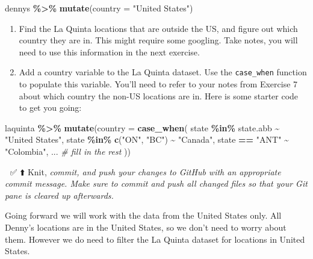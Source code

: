 \documentclass[
]{article}
\newenvironment{Shaded}{\begin{snugshade}}{\end{snugshade}}
\newcommand{\AttributeTok}[1]{\textcolor[rgb]{0.13,0.29,0.53}{#1}}
\newcommand{\CommentTok}[1]{\textcolor[rgb]{0.56,0.35,0.01}{\textit{#1}}}
\newcommand{\FunctionTok}[1]{\textcolor[rgb]{0.13,0.29,0.53}{\textbf{#1}}}
\newcommand{\NormalTok}[1]{#1}
\newcommand{\SpecialCharTok}[1]{\textcolor[rgb]{0.81,0.36,0.00}{\textbf{#1}}}
\newcommand{\StringTok}[1]{\textcolor[rgb]{0.31,0.60,0.02}{#1}}
\begin{document}
\begin{Shaded}
\begin{Highlighting}[]
\NormalTok{dennys }\SpecialCharTok{\%\textgreater{}\%}
  \FunctionTok{mutate}\NormalTok{(}\AttributeTok{country =} \StringTok{"United States"}\NormalTok{)}
\end{Highlighting}
\end{Shaded}

\begin{enumerate}
\def\labelenumi{\arabic{enumi}.}
\setcounter{enumi}{6}
\item
  Find the La Quinta locations that are outside the US, and figure out
  which country they are in. This might require some googling. Take
  notes, you will need to use this information in the next exercise.
\item
  Add a country variable to the La Quinta dataset. Use the
  \texttt{case\_when} function to populate this variable. You'll need to
  refer to your notes from Exercise 7 about which country the non-US
  locations are in. Here is some starter code to get you going:
\end{enumerate}

\begin{Shaded}
\begin{Highlighting}[]
\NormalTok{laquinta }\SpecialCharTok{\%\textgreater{}\%}
  \FunctionTok{mutate}\NormalTok{(}\AttributeTok{country =} \FunctionTok{case\_when}\NormalTok{(}
\NormalTok{    state }\SpecialCharTok{\%in\%}\NormalTok{ state.abb     }\SpecialCharTok{\textasciitilde{}} \StringTok{"United States"}\NormalTok{,}
\NormalTok{    state }\SpecialCharTok{\%in\%} \FunctionTok{c}\NormalTok{(}\StringTok{"ON"}\NormalTok{, }\StringTok{"BC"}\NormalTok{) }\SpecialCharTok{\textasciitilde{}} \StringTok{"Canada"}\NormalTok{,}
\NormalTok{    state }\SpecialCharTok{==} \StringTok{"ANT"}           \SpecialCharTok{\textasciitilde{}} \StringTok{"Colombia"}\NormalTok{,}
\NormalTok{    ...                      }\CommentTok{\# fill in the rest}
\NormalTok{  ))}
\end{Highlighting}
\end{Shaded}

🧶 ✅ ⬆️ Knit, \emph{commit, and push your changes to GitHub with an
appropriate commit message. Make sure to commit and push all changed
files so that your Git pane is cleared up afterwards.}

Going forward we will work with the data from the United States only.
All Denny's locations are in the United States, so we don't need to
worry about them. However we do need to filter the La Quinta dataset for
locations in United States.
\end{document}
